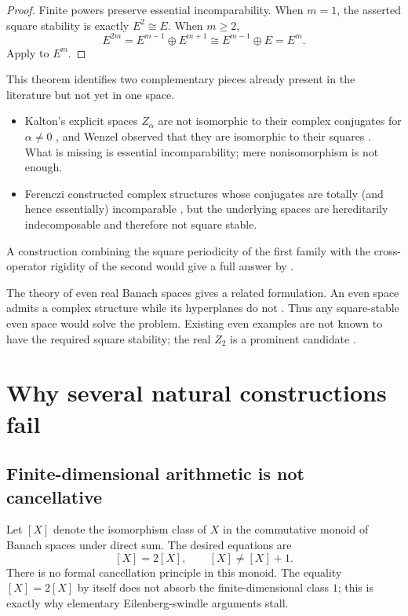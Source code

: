 \documentclass[11pt]{article}
\theoremstyle{definition}
\theoremstyle{remark}
\begin{document}
\begin{proof}
Finite powers preserve essential incomparability.  When $m=1$, the asserted
square stability is exactly $E^2\cong E$.  When $m\ge2$,
\[
 E^{2m}=E^{m-1}\oplus E^{m+1}\cong E^{m-1}\oplus E=E^m.
\]
Apply  to $E^m$.
\end{proof}

This theorem identifies two complementary pieces already present in the
literature but not yet in one space.
\begin{itemize}[leftmargin=1.6em]
\item Kalton's explicit spaces $Z_\alpha$ are not isomorphic to their complex
conjugates for $\alpha\ne0$ \cite{Kalton1995}, and Wenzel observed that they are
isomorphic to their squares \cite{Wenzel1997}.  What is missing is essential
incomparability; mere nonisomorphism is not enough.
\item Ferenczi constructed complex structures whose conjugates are totally (and
hence essentially) incomparable \cite{Ferenczi2007}, but the underlying spaces
are hereditarily indecomposable and therefore not square stable.
\end{itemize}
A construction combining the square periodicity of the first family with the
cross-operator rigidity of the second would give a full answer by
.

The theory of even real Banach spaces gives a related formulation.  An even
space admits a complex structure while its hyperplanes do not
\cite{FerencziGalego2007}.  Thus any square-stable even space would solve the
problem.  Existing even examples are not known to have the required square
stability; the real $Z_2$ is a prominent candidate
\cite{CarreraFerenczi2026}.

\section{Why several natural constructions fail}

\subsection{Finite-dimensional arithmetic is not cancellative}

Let $[X]$ denote the isomorphism class of $X$ in the commutative monoid of
Banach spaces under direct sum.  The desired equations are
\[
 [X]=2[X],
 \qquad [X]\ne[X]+1.
\]
There is no formal cancellation principle in this monoid.  The equality
$[X]=2[X]$ by itself does not absorb the finite-dimensional class $1$; this is
exactly why elementary Eilenberg-swindle arguments stall.
\end{document}
